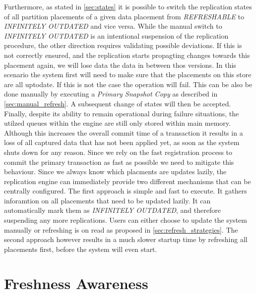 Furthermore, as stated in \ref{sec:states} it is possible to switch the replication states of all partition placements of a given data placement from \emph{REFRESHABLE} to 
\emph{INFINITELY OUTDATED} and vice versa.
While the manual switch to \emph{INFINITELY OUTDATED} is an intentional suspension of the replication procedure, the other direction requires validating possible deviations.
If this is not correctly ensured, and the replication starts propagting changes towards this placement again, we will lose data the data in between thos versions.
In this scenario the system first will need to make sure that the placements on this store are all uptodate. If this is not the case the operation will fail. 
This can be also be done manually by executing a \emph{Primary Snapshot Copy} as described in \ref{sec:manual_refresh}. A subsequent change of states will then be accepted.\\

Finally, despite its ability to remain operational during failure situations, the utilzed queues within the engine are still only stored within main memory.
Although this increases the overall commit time of a transaction it results in a loss of all captured data that has not been applied yet, as soon as the system 
shuts down for any reason. Since we rely on the fast registration process to commit the primary transaction as fast as possible we need to mitigate this behaviour.
Since we always know which placments are updates lazily, the replication engine can immediately provide two different mechanisms that can be centrally configured. 
The first approach is simple and fast to execute. It gathers inforamtion on all placements that need to be updated lazily. It can automatically mark them as 
\emph{INFINITELY OUTDATED}, 
and therefore suspending any more replications. Users can either choose to update the system manually or refreshing is on read as proposed in \ref{sec:refresh_strategies}.
The second approach however results in a much slower startup time by refreshing all placements first, before the system will even start.









\section{Freshness Awareness}

